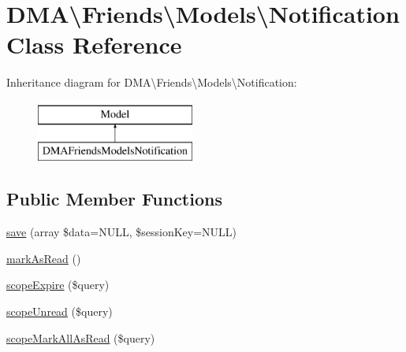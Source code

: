 \hypertarget{classDMA_1_1Friends_1_1Models_1_1Notification}{\section{D\+M\+A\textbackslash{}Friends\textbackslash{}Models\textbackslash{}Notification Class Reference}
\label{classDMA_1_1Friends_1_1Models_1_1Notification}
}
Inheritance diagram for D\+M\+A\textbackslash{}Friends\textbackslash{}Models\textbackslash{}Notification\+:\begin{figure}[H]
\begin{center}
\leavevmode
\includegraphics[height=2.000000cm]{de/d7f/classDMA_1_1Friends_1_1Models_1_1Notification}
\end{center}
\end{figure}
\subsection*{Public Member Functions}
\begin{DoxyCompactItemize}
\item 
\hyperlink{classDMA_1_1Friends_1_1Models_1_1Notification_a221608de6df08ac2cab3b145410bc012}{save} (array \$data=N\+U\+L\+L, \$session\+Key=N\+U\+L\+L)
\item 
\hyperlink{classDMA_1_1Friends_1_1Models_1_1Notification_a8618793fa0a9030d6cbfae08a3b74803}{mark\+As\+Read} ()
\item 
\hyperlink{classDMA_1_1Friends_1_1Models_1_1Notification_a547f0a3264c192e47c48f54d7b42c5a5}{scope\+Expire} (\$query)
\item 
\hyperlink{classDMA_1_1Friends_1_1Models_1_1Notification_a92a7c07cfcd4bcb202edb6969fc8c309}{scope\+Unread} (\$query)
\item 
\hyperlink{classDMA_1_1Friends_1_1Models_1_1Notification_a9dd9e4ffa1c0a4047556cd25bcfa0a5a}{scope\+Mark\+All\+As\+Read} (\$query)
\end{DoxyCompactItemize}
